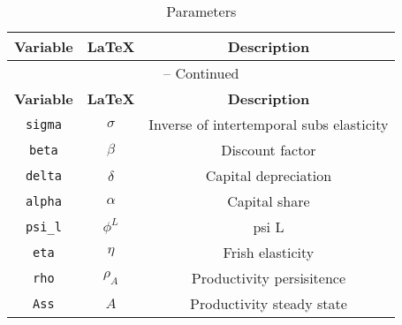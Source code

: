 \begin{center}
\begin{longtable}{ccc}
\caption{Parameters}\\%
\hline%
\multicolumn{1}{c}{\textbf{Variable}} &
\multicolumn{1}{c}{\textbf{\LaTeX}} &
\multicolumn{1}{c}{\textbf{Description}}\\%
\hline\hline%
\endfirsthead
\multicolumn{3}{c}{{\tablename} \thetable{} -- Continued}\\%
\hline%
\multicolumn{1}{c}{\textbf{Variable}} &
\multicolumn{1}{c}{\textbf{\LaTeX}} &
\multicolumn{1}{c}{\textbf{Description}}\\%
\hline\hline%
\endhead
\texttt{sigma} & $\sigma$ & Inverse of intertemporal subs elasticity\\
\texttt{beta} & $\beta$ & Discount factor\\
\texttt{delta} & $\delta$ & Capital depreciation\\
\texttt{alpha} & $\alpha$ & Capital share\\
\texttt{psi\_l} & $\phi^{L}$ & psi L\\
\texttt{eta} & $\eta$ & Frish elasticity\\
\texttt{rho} & $\rho_{A}$ & Productivity persisitence\\
\texttt{Ass} & $A$ & Productivity steady state\\
\hline%
\end{longtable}
\end{center}
